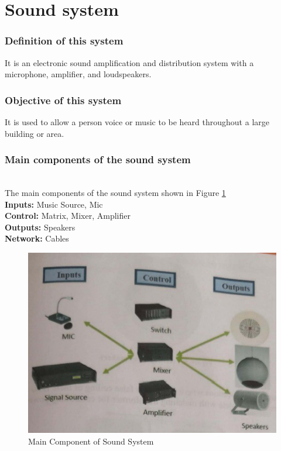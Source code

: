 \documentclass[12pt,fleqn]{book} %
\begin{document}
\section{Sound system}
\subsubsection{Definition of this system}
It is an electronic sound amplification and distribution system with a microphone, amplifier, and loudspeakers.
\subsubsection{Objective of this system}
It is used to allow a person voice or music to be heard throughout a large building or area.
\subsubsection{Main components of the sound system}
\\ The main components of the sound system shown in Figure \ref{fig:hamdy 65}
\\ \textbf{Inputs:} Music Source, Mic 
\\ \textbf{Control:} Matrix, Mixer, Amplifier
\\ \textbf{Outputs:} Speakers
\\ \textbf{Network:} Cables
\begin{figure}[!h]
    \centering
    \includegraphics[width=1\linewidth]{hamdy 65.png}
    \caption{Main Component of Sound System}
    \label{fig:hamdy 65}
    \end{figure}
\end{document}

